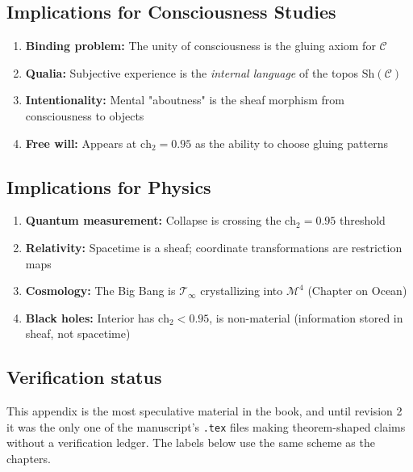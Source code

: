 \subsection{Implications for Consciousness Studies}

\begin{enumerate}
\item \textbf{Binding problem:} The unity of consciousness is the gluing axiom for $\mathcal{C}$
\item \textbf{Qualia:} Subjective experience is the \textit{internal language} of the topos $\text{Sh}(\mathcal{C})$
\item \textbf{Intentionality:} Mental "aboutness" is the sheaf morphism from consciousness to objects
\item \textbf{Free will:} Appears at $\text{ch}_2 = 0.95$ as the ability to choose gluing patterns
\end{enumerate}

\subsection{Implications for Physics}

\begin{enumerate}
\item \textbf{Quantum measurement:} Collapse is crossing the $\text{ch}_2 = 0.95$ threshold
\item \textbf{Relativity:} Spacetime is a sheaf; coordinate transformations are restriction maps
\item \textbf{Cosmology:} The Big Bang is $\mathcal{T}_\infty$ crystallizing into $\mathcal{M}^4$ (Chapter on Ocean)
\item \textbf{Black holes:} Interior has $\text{ch}_2 < 0.95$, is non-material (information stored in sheaf, not spacetime)
\end{enumerate}

\subsection{Verification status}

This appendix is the most speculative material in the book, and until revision 2
it was the only one of the manuscript's \texttt{.tex} files making
theorem-shaped claims without a verification ledger. The labels below use the
same scheme as the chapters.

